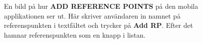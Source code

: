 \documentclass[a4paper,12pt]{article}
\begin{document}
 \begin{figure}[H]
   \centering
   \caption{En bild på hur \textbf{ADD REFERENCE POINTS} på den mobila applikationen ser ut. Här skriver användaren in namnet på referenspunkten i textfältet och trycker på \textbf{Add RP}. Efter det hamnar referenspunkten som en knapp i listan.}
   \label{fig:mob_scan_ref}
 \end{figure}
\end{document}

